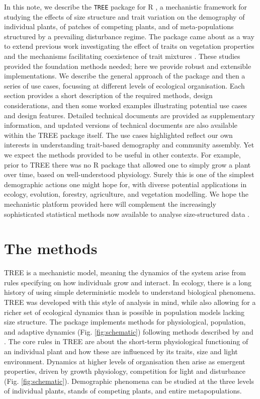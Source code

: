 \documentclass[]{article}
\begin{document}
In this note, we describe the \texttt{TREE} package for R
\citep{R-2015}, a mechanistic framework for studying the effects of size
structure and trait variation on the demography of individual plants, of
patches of competing plants, and of meta-populations structured by a
prevailing disturbance regime. The package came about as a way to extend
previous work investigating the effect of traits on vegetation
properties \citep{Falster-2011} and the mechanisms facilitating
coexistence of trait mixtures \citep{Falster-2015}. These studies
provided the foundation methods needed; here we provide robust and
extensible implementations. We describe the general approach of the
package and then a series of use cases, focussing at different levels of
ecological organisation. Each section provides a short description of
the required methods, design considerations, and then some worked
examples illustrating potential use cases and design features. Detailed
technical documents are provided as supplementary information, and updated
versions of technical documents are also available within the TREE
package itself. The use cases highlighted reflect our own interests in
understanding trait-based demography and community assembly. Yet we
expect the methods provided to be useful in other contexts. For example,
prior to TREE there was no R package that allowed one to simply grow a
plant over time, based on well-understood physiology. Surely this is one
of the simplest demographic actions one might hope for, with diverse
potential applications in ecology, evolution, forestry, agriculture, and
vegetation modelling. We hope the mechanistic platform provided here
will complement the increasingly sophisticated statistical methods now
available to analyse size-structured data \citep[e.g.][]{Metcalf-2013}.

\section{The methods}\label{the-methods}

TREE is a mechanistic model, meaning the dynamics of the system arise
from rules specifying on how individuals grow and interact. In ecology,
there is a long history of using simple deterministic models \citep[such
as Lotka-Volterra population dynamics,
e.g.][]{MacArthur-1967, Leimar-2013} to understand biological phenomena.
TREE was developed with this style of analysis in mind, while also
allowing for a richer set of ecological dynamics than is possible in
population models lacking size structure. The package implements methods
for physiological, population, and adaptive dynamics (Fig.
\ref{fig:schematic}) following methods described by \citet{Falster-2011}
and \citet{Falster-2015}. The core rules in TREE are about the
short-term physiological functioning of an individual plant and how
these are influenced by its traits, size and light environment. Dynamics
at higher levels of organisation then arise as emergent properties,
driven by growth physiology, competition for light and disturbance (Fig.
\ref{fig:schematic}). Demographic phenomena can be studied at the three
levels of individual plants, stands of competing plants, and entire
metapopulations.
\end{document}
